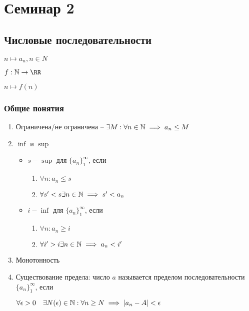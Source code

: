 \section{Семинар 2}
\subsection{Числовые последовательности}

$n \mapsto a_n, n \in N$

$f: \NN \to \RR$

$n \mapsto f(n)$

\subsubsection{Общие понятия}
\begin{enumerate}
\item
    Ограничена/не ограничена -- $\exists M : \forall n \in \mathbb{N} \implies a_n \leq M$

\item
    $\inf$ и $\sup$
    
    \begin{itemize}
    \item 
        $s - \sup$ для $\{a_n\}_1^\infty$, если 

        \begin{enumerate}
        \item 
            $\forall n : a_n \leq s$
        \item
            $\forall s' < s \exists n \in \mathbb{N} \implies s' < a_n$
        \end{enumerate}
    \item
        $i - \inf$ для $\{a_n\}_1^\infty$, если
        \begin{enumerate}
        \item $\forall n : a_n \geq i$
        \item $\forall i' > i \exists n \in \mathbb{N} \implies a_n < i'$
        \end{enumerate}
    \end{itemize}

\item
    Монотонность

\item
    Существование предела: число $a$ называется пределом последовательности $\{a_n\}_1^\infty$, если 

    $\forall \epsilon > 0 \quad \exists N (\epsilon) \in \mathbb{N} : \forall n \geq N \implies |a_n - A| < \epsilon$


\end{enumerate}
